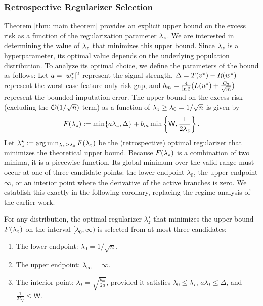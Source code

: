 \subsubsection{Retrospective Regularizer Selection}

Theorem \ref{thm: main theorem} provides an explicit upper bound on the excess risk as a function of the regularization parameter $\lambda_z$. We are interested in determining the value of $\lambda_z$ that minimizes this upper bound. Since $\lambda_z$ is a hyperparameter, its optimal value depends on the underlying population distribution. To analyze its optimal choice, we define the parameters of the bound as follows: Let $a = |w^\star_z|^2$ represent the signal strength, $\Delta = T(v^\star) - R(w^\star)$ represent the worst-case feature-only risk gap, and $b_m = \frac{4}{\ln 2}(L(u^\star) + \frac{C_2}{\sqrt{m}})$ represent the bounded imputation error. The upper bound on the excess risk (excluding the $\mathcal{O}(1/\sqrt{n})$ term) as a function of $\lambda_z \ge \lambda_0 = 1/\sqrt{n}$ is given by
\begin{equation}\label{eqn: F lambda}
    F(\lambda_z) := \min\{a\lambda_z, \Delta\} + b_m \min\left\{\mathsf{W}, \frac{1}{2\lambda_z}\right\}.
\end{equation}
Let $\lambda_z^\star := \arg\min_{\lambda_z \ge \lambda_0} F(\lambda_z)$ be the (retrospective) optimal regularizer that minimizes the theoretical upper bound. 
Because $F(\lambda_z)$ is a combination of two minima, it is a piecewise function. Its global minimum over the valid range must occur at one of three candidate points: the lower endpoint $\lambda_0$, the upper endpoint $\infty$, or an interior point where the derivative of the active branches is zero. We establish this exactly in the following corollary, replacing the regime analysis of the earlier work.

\begin{corollary}\label{cor: three candidates}
For any distribution, the optimal regularizer $\lambda_z^\star$ that minimizes the upper bound $F(\lambda_z)$ on the interval $[\lambda_0, \infty)$ is selected from at most three candidates:
\begin{enumerate}
\item The lower endpoint: $\lambda_0 = 1/\sqrt{n}$.
\item The upper endpoint: $\lambda_\infty = \infty$.
\item The interior point: $\lambda_I = \sqrt{\frac{b_m}{2a}}$, provided it satisfies $\lambda_0 \le \lambda_I$, $a\lambda_I \le \Delta$, and $\frac{1}{2\lambda_I} \le \mathsf{W}$.
\end{enumerate}
\end{corollary}

